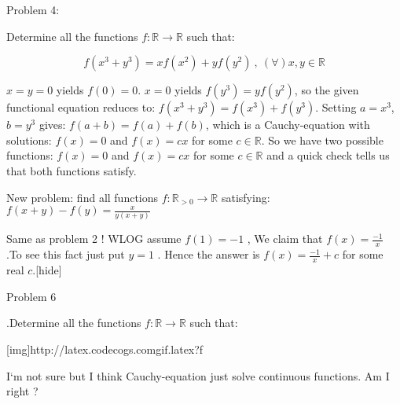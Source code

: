 \begin{solution}
	\begin{bolded}Problem 4:\end{bolded} Determine all the functions $f:\mathbb{R}\rightarrow \mathbb{R}$ such that:

\[f(x^3+y^3)=xf(x^2)+yf(y^2)\ ,\ (\forall)x,y\in \mathbb{R}\]
\end{solution}



\begin{solution}
	$x=y=0$ yields $f(0)=0$.
$x=0$ yields $f(y^3)=yf(y^2)$, so the given functional equation reduces to:
$f(x^3+y^3)=f(x^3)+f(y^3)$.
Setting $a=x^3$, $b=y^3$ gives:
$f(a+b)=f(a)+f(b)$, which is a Cauchy-equation with solutions:
$f(x)=0$ and $f(x)=cx$ for some $c \in \mathbb{R}$.
So we have two possible functions:
$f(x)=0$ and $f(x)=cx$ for some $c \in \mathbb{R}$ and a quick check tells us that both functions satisfy.

New problem:
find all functions $f: \mathbb{R}_{>0} \rightarrow \mathbb{R}$ satisfying:
$f(x+y)-f(y) = \frac{x}{y(x+y)}$
\end{solution}



\begin{solution}Same as problem 2 ! WLOG assume $f(1) = -1$ , We claim that $f(x)= \frac{-1}{x}$ .To see this fact just put $y=1$ . Hence the answer is $f(x) = \frac{-1}{x} + c$ for some real $c$.[\/hide]

\begin{bolded}Problem 6\end{bolded}.Determine all the functions $ f:\mathbb{R}\rightarrow\mathbb{R} $ such that:

[img]http://latex.codecogs.com\/gif.latex?f%
\end{solution}



\begin{solution}

I`m not sure but I think Cauchy-equation just solve continuous functions. Am I right ?
\end{solution}



